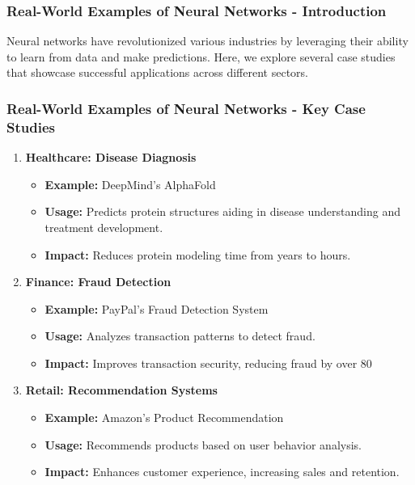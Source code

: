 \documentclass[aspectratio=169]{beamer}
\begin{document}
\begin{frame}[fragile]
    \frametitle{Real-World Examples of Neural Networks - Introduction}
    Neural networks have revolutionized various industries by leveraging their ability to learn from data and make predictions. Here, we explore several case studies that showcase successful applications across different sectors.
\end{frame}

\begin{frame}[fragile]
    \frametitle{Real-World Examples of Neural Networks - Key Case Studies}
    \begin{enumerate}
        \item \textbf{Healthcare: Disease Diagnosis}
            \begin{itemize}
                \item \textbf{Example:} DeepMind's AlphaFold
                \item \textbf{Usage:} Predicts protein structures aiding in disease understanding and treatment development.
                \item \textbf{Impact:} Reduces protein modeling time from years to hours.
            \end{itemize}
        
        \item \textbf{Finance: Fraud Detection}
            \begin{itemize}
                \item \textbf{Example:} PayPal's Fraud Detection System
                \item \textbf{Usage:} Analyzes transaction patterns to detect fraud.
                \item \textbf{Impact:} Improves transaction security, reducing fraud by over 80%
            \end{itemize}

        \item \textbf{Retail: Recommendation Systems}
            \begin{itemize}
                \item \textbf{Example:} Amazon's Product Recommendation
                \item \textbf{Usage:} Recommends products based on user behavior analysis.
                \item \textbf{Impact:} Enhances customer experience, increasing sales and retention.
            \end{itemize}
    \end{enumerate}
\end{frame}
\end{document}

